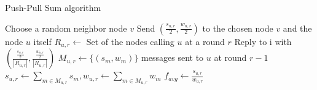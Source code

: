 \renewcommand{\algorithmicrequire}{\textbf{Input:}}
\renewcommand{\algorithmicensure}{\textbf{Output:}}
\begin{algorithm}[]
\caption{Push-Pull Sum algorithm}\label{alg:PPS}
\begin{algorithmic}[1]
\State Choose a random neighbor node $v$
\State Send $(\frac{s_{u,r}}{2}, \frac{w_{u,r}}{2})$ to the chosen node $v$ and the node $u$ itself
\EndProcedure
{}
\State $R_{u,r} \leftarrow$ Set of the nodes calling $u$ at a round $r$
\State Reply to i with $\left( \frac{\frac{s_{u,r}}{2}}{|R_{u,r}|}, \frac{\frac{w_{u,r}}{2}}{|R_{u,r}|} \right)$
\EndFor
\EndProcedure
{}
\State $M_{u,r} \leftarrow \{(s_{m}, w_{m})\}$ messages sent to $u$ at round $r-1$
\State $s_{u,r} \leftarrow \sum_{m \in M_{u,r}}^{}s_{m}, w_{u,r} \leftarrow\sum_{m \in M_{u,r}}^{}w_{m}$
\State $f_{avg} \leftarrow \frac{s_{u,r}}{w_{u,r}}$
\EndProcedure
\end{algorithmic}
\end{algorithm}
